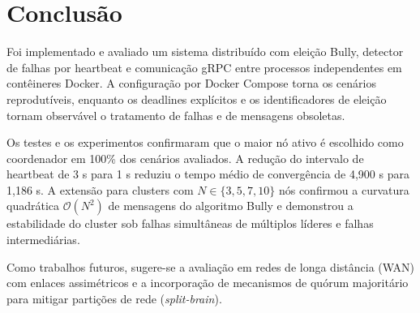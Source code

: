 \section{Conclusão}
\label{sec:conclusao}

Foi implementado e avaliado um sistema distribuído com eleição Bully, detector de
falhas por heartbeat e comunicação gRPC entre processos independentes em contêineres
Docker. A configuração por Docker Compose torna os cenários reprodutíveis,
enquanto os deadlines explícitos e os identificadores de eleição tornam observável
o tratamento de falhas e de mensagens obsoletas.

Os testes e os experimentos confirmaram que o maior nó ativo é escolhido como
coordenador em 100\% dos cenários avaliados. A redução do intervalo de heartbeat
de 3 s para 1 s reduziu o tempo médio de convergência de 4,900 s para 1,186 s.
A extensão para clusters com $N \in \{3, 5, 7, 10\}$ nós confirmou a curvatura
quadrática $\mathcal{O}(N^2)$ de mensagens do algoritmo Bully e demonstrou a
estabilidade do cluster sob falhas simultâneas de múltiplos líderes e falhas
intermediárias.

Como trabalhos futuros, sugere-se a avaliação em redes de longa distância (WAN)
com enlaces assimétricos e a incorporação de mecanismos de quórum majoritário
para mitigar partições de rede (\textit{split-brain}).
